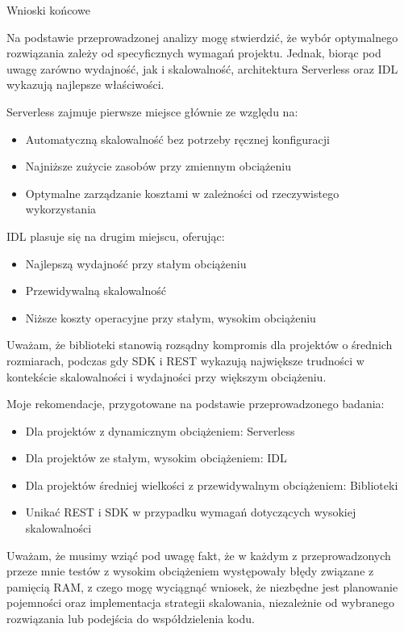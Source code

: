\documentclass[runningheads,12pt]{llncs}
\begin{document}
Wnioski końcowe

Na podstawie przeprowadzonej analizy mogę stwierdzić, że wybór optymalnego rozwiązania zależy od specyficznych wymagań projektu. Jednak, biorąc pod uwagę zarówno wydajność, jak i skalowalność, architektura Serverless oraz IDL wykazują najlepsze właściwości.

Serverless zajmuje pierwsze miejsce głównie ze względu na:
\begin{itemize}
    \item Automatyczną skalowalność bez potrzeby ręcznej konfiguracji
    \item Najniższe zużycie zasobów przy zmiennym obciążeniu
    \item Optymalne zarządzanie kosztami w zależności od rzeczywistego wykorzystania
\end{itemize}

IDL plasuje się na drugim miejscu, oferując:
\begin{itemize}
    \item Najlepszą wydajność przy stałym obciążeniu
    \item Przewidywalną skalowalność
    \item Niższe koszty operacyjne przy stałym, wysokim obciążeniu
\end{itemize}

Uważam, że biblioteki stanowią rozsądny kompromis dla projektów o średnich rozmiarach, podczas gdy SDK i REST wykazują największe trudności w kontekście skalowalności i wydajności przy większym obciążeniu.

Moje rekomendacje, przygotowane na podstawie przeprowadzonego badania:

\begin{itemize}
    \item Dla projektów z dynamicznym obciążeniem: Serverless
    \item Dla projektów ze stałym, wysokim obciążeniem: IDL
    \item Dla projektów średniej wielkości z przewidywalnym obciążeniem: Biblioteki
    \item Unikać REST i SDK w przypadku wymagań dotyczących wysokiej skalowalności
\end{itemize}

Uważam, że musimy wziąć pod uwagę fakt, że w każdym z przeprowadzonych przeze mnie testów z wysokim obciążeniem występowały błędy związane z pamięcią RAM, z czego mogę wyciągnąć wniosek, że niezbędne jest planowanie pojemności oraz implementacja strategii skalowania, niezależnie od wybranego rozwiązania lub podejścia do współdzielenia kodu.
\end{document}
